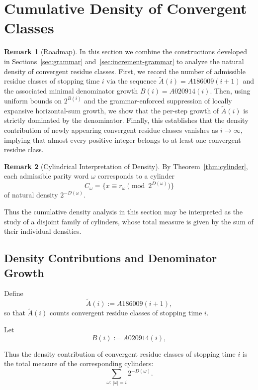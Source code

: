 \documentclass[12pt, oneside]{article}   	%
\numberwithin{equation}{section}          %
\theoremstyle{definition}
\newtheorem*{remark}{Remark}
\begin{document}
\section{Cumulative Density of Convergent Classes}
\label{sec:cumulative-density}

\begin{remark}[Roadmap]
In this section we combine the constructions developed in Sections~\ref{sec:grammar}
and~\ref{sec:increment-grammar} to analyze the natural density of convergent residue
classes. First, we record the number of admissible residue classes of stopping time
\(i\) via the sequence \(\widetilde A(i) = A186009(i+1)\) and the associated minimal
denominator growth \(B(i) = A020914(i)\). Then, using uniform bounds on \(2^{B(i)}\)
and the grammar-enforced suppression of locally expansive horizontal-sum growth, we show
that the per-step growth of \(\widetilde A(i)\) is strictly dominated by the denominator.
Finally, this establishes that the density contribution of newly appearing convergent
residue classes vanishes as \(i\to\infty\), implying that almost every positive integer
belongs to at least one convergent residue class.
\end{remark}

\begin{remark}[Cylindrical Interpretation of Density]
By Theorem~\ref{thm:cylinder}, each admissible parity word $\omega$
corresponds to a cylinder
\[
C_\omega = \{x \equiv r_\omega \pmod{2^{D(\omega)}}\}
\]
of natural density $2^{-D(\omega)}$.

Thus the cumulative density analysis in this section may be interpreted
as the study of a disjoint family of cylinders, whose total measure is
given by the sum of their individual densities.
\end{remark}


\subsection{Density Contributions and Denominator Growth}

Define
\[
\widetilde A(i) := A186009(i+1),
\]
so that $\widetilde A(i)$ counts convergent residue classes of stopping time $i$.

Let
\[
B(i) := A020914(i),
\]

Thus the density contribution of convergent residue classes of stopping time $i$
is the total measure of the corresponding cylinders:
\[
\sum_{\omega:\,|\omega|=i} 2^{-D(\omega)}.
\]
\end{document}
